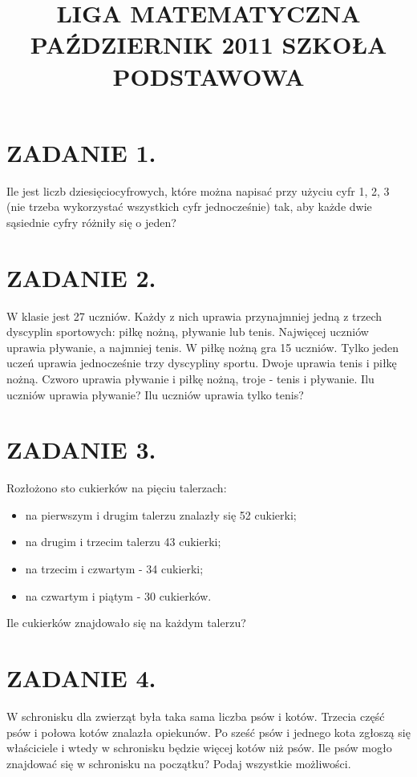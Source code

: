 \documentclass[10pt]{article}
\title{LIGA MATEMATYCZNA PAŹDZIERNIK 2011 SZKOŁA PODSTAWOWA }
\author{}
\date{}
\begin{document}
\maketitle
\section*{ZADANIE 1.}
Ile jest liczb dziesięciocyfrowych, które można napisać przy użyciu cyfr 1, 2, 3 (nie trzeba wykorzystać wszystkich cyfr jednocześnie) tak, aby każde dwie sąsiednie cyfry różniły się o jeden?

\section*{ZADANIE 2.}
W klasie jest 27 uczniów. Każdy z nich uprawia przynajmniej jedną z trzech dyscyplin sportowych: piłkę nożną, pływanie lub tenis. Najwięcej uczniów uprawia pływanie, a najmniej tenis. W piłkę nożną gra 15 uczniów. Tylko jeden uczeń uprawia jednocześnie trzy dyscypliny sportu. Dwoje uprawia tenis i piłkę nożną. Czworo uprawia pływanie i piłkę nożną, troje - tenis i pływanie. Ilu uczniów uprawia pływanie? Ilu uczniów uprawia tylko tenis?

\section*{ZADANIE 3.}
Rozłożono sto cukierków na pięciu talerzach:

\begin{itemize}
  \item na pierwszym i drugim talerzu znalazły się 52 cukierki;
  \item na drugim i trzecim talerzu 43 cukierki;
  \item na trzecim i czwartym - 34 cukierki;
  \item na czwartym i piątym - 30 cukierków.
\end{itemize}

Ile cukierków znajdowało się na każdym talerzu?

\section*{ZADANIE 4.}
W schronisku dla zwierząt była taka sama liczba psów i kotów. Trzecia część psów i połowa kotów znalazła opiekunów. Po sześć psów i jednego kota zgłoszą się właściciele i wtedy w schronisku będzie więcej kotów niż psów. Ile psów mogło znajdować się w schronisku na początku? Podaj wszystkie możliwości.
\end{document}
